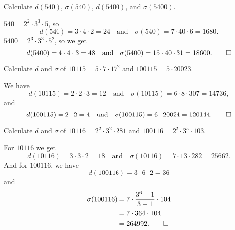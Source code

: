  Calculate $d(540)$, $\sigma(540)$, $d(5400)$, and
$\sigma(5400)$.
\begin{solution}
  $540 = 2^2\cdot3^3\cdot5$, so
  \begin{equation*}
    d(540) = 3\cdot4\cdot2 = 24
    \quad\text{and}\quad
    \sigma(540) = 7\cdot40\cdot6 = 1680.
  \end{equation*}
  $5400 = 2^3\cdot3^3\cdot5^2$, so we get
  \begin{equation*}
    d(5400) = 4\cdot4\cdot3 = 48
    \quad\text{and}\quad
    \sigma(5400) = 15\cdot40\cdot31 = 18600. \qedhere
  \end{equation*}
\end{solution}

 Calculate $d$ and $\sigma$ of $10115 = 5\cdot7\cdot17^2$ and
$100115 = 5\cdot20023$.
\begin{solution}
  We have
  \begin{equation*}
    d(10115) = 2\cdot2\cdot3 = 12
    \quad\text{and}\quad
    \sigma(10115) = 6\cdot8\cdot307 = 14736,
  \end{equation*}
  and
  \begin{equation*}
    d(100115) = 2\cdot2 = 4
    \quad\text{and}\quad
    \sigma(100115) = 6\cdot20024 = 120144. \qedhere
  \end{equation*}
\end{solution}

 Calculate $d$ and $\sigma$ of $10116 = 2^2\cdot3^2\cdot281$
and $100116 = 2^2\cdot3^5\cdot103$.
\begin{solution}
  For $10116$ we get
  \begin{equation*}
    d(10116) = 3\cdot3\cdot2 = 18
    \quad\text{and}\quad
    \sigma(10116) = 7\cdot13\cdot282 = 25662.
  \end{equation*}
  And for $100116$, we have
  \begin{equation*}
    d(100116) = 3\cdot6\cdot2 = 36
  \end{equation*}
  and
  \begin{align*}
    \sigma(100116) &= 7\cdot\frac{3^6 - 1}{3 - 1}\cdot104 \\
                   &= 7\cdot364\cdot104 \\
                   &= 264992. \qedhere
  \end{align*}
\end{solution}
